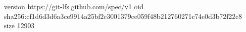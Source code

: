 version https://git-lfs.github.com/spec/v1
oid sha256:cf1d6d3d6a3ce9914a25bf2c3001379ce059f48b212760271c74e0d3b72f22c8
size 12903
